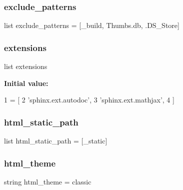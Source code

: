 \hypertarget{namespaceconf_a16535c83d9b5c141382335d79b4995b2}{}\label{namespaceconf_a16535c83d9b5c141382335d79b4995b2} 
\subsubsection{\texorpdfstring{exclude\+\_\+patterns}{exclude\_patterns}}
{\footnotesize\ttfamily list exclude\+\_\+patterns = \mbox{[}\textquotesingle{}\+\_\+build\textquotesingle{}, \textquotesingle{}Thumbs.\+db\textquotesingle{}, \textquotesingle{}.D\+S\+\_\+\+Store\textquotesingle{}\mbox{]}}

\hypertarget{namespaceconf_ac2adb9cb4fae2807baaf6a3fb59cbebb}{}\label{namespaceconf_ac2adb9cb4fae2807baaf6a3fb59cbebb} 
\subsubsection{\texorpdfstring{extensions}{extensions}}
{\footnotesize\ttfamily list extensions}

{\bfseries Initial value\+:}
\begin{DoxyCode}
1 =  [
2     \textcolor{stringliteral}{'sphinx.ext.autodoc'},
3     \textcolor{stringliteral}{'sphinx.ext.mathjax'},
4 ]
\end{DoxyCode}
\hypertarget{namespaceconf_a0a3ed65f01f948fea22a3928be863e0f}{}\label{namespaceconf_a0a3ed65f01f948fea22a3928be863e0f} 
\subsubsection{\texorpdfstring{html\+\_\+static\+\_\+path}{html\_static\_path}}
{\footnotesize\ttfamily list html\+\_\+static\+\_\+path = \mbox{[}\textquotesingle{}\+\_\+static\textquotesingle{}\mbox{]}}

\hypertarget{namespaceconf_ae3cdb5291b613a54e31ca9520cddb940}{}\label{namespaceconf_ae3cdb5291b613a54e31ca9520cddb940} 
\subsubsection{\texorpdfstring{html\+\_\+theme}{html\_theme}}
{\footnotesize\ttfamily string html\+\_\+theme = \textquotesingle{}classic\textquotesingle{}}

